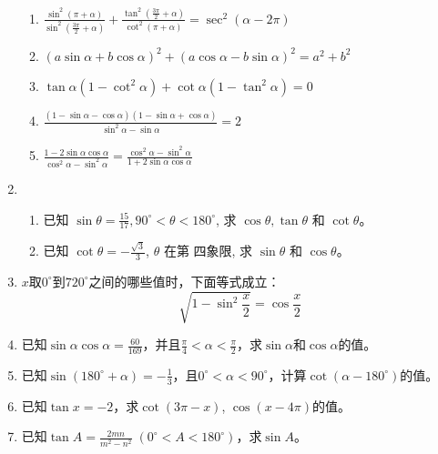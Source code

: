 \begin{enumerate}
\begin{enumerate}
\item $\frac{\sin ^{2}(\pi+\alpha)}{\sin ^{2}\left(\frac{3 \pi}{2}+\alpha\right)}+\frac{\tan^{2}\left(\frac{3 \pi}{2}+\alpha\right)}{\cot^{2}(\pi+\alpha)} =\sec ^{2}(\alpha-2 \pi)$
\item $(a \sin \alpha+b \cos \alpha)^{2}+(a \cos \alpha-b \sin \alpha)^{2}=a^{2}+b^{2}$
\item $\tan \alpha\left(1-\cot^{2} \alpha\right)+\cot \alpha\left(1-\tan^{2} \alpha\right)=0$
\item $\frac{(1-\sin \alpha-\cos \alpha)(1-\sin \alpha+\cos \alpha)}{\sin ^{2} \alpha-\sin \alpha}=2$
\item $\frac{1-2 \sin \alpha \cos \alpha}{\cos ^{2} \alpha-\sin ^{2} \alpha}=\frac{\cos ^{2} \alpha-\sin ^{2} \alpha}{1+2 \sin \alpha \cos \alpha}$
\end{enumerate}

\item \begin{enumerate}
    \item 已知 $\sin \theta=\frac{15}{17}, 90^{\circ}<\theta<180^{\circ}$,
求 $\cos \theta, \tan \theta$ 和 $\cot \theta$。

\item 已知 $\cot \theta=-\frac{\sqrt{3}}{3}$, $\theta$ 在第 四象限, 求 $\sin \theta$ 和 $\cos \theta$。
\end{enumerate} 

\item $x$取$0^{\circ}$到$720^{\circ}$之间的哪些值时，下面等式成立：
\[\sqrt{1-\sin^2\frac{x}{2}}=\cos\frac{x}{2}\]

\item 已知$\sin\alpha\cos\alpha=\frac{60}{169}$，并且$\frac{\pi}{4}<\alpha<\frac{\pi}{2}$，求$\sin\alpha$和$\cos\alpha$的值。

\item 已知$\sin(180^{\circ}+\alpha)=-\frac{1}{3}$，且$0^{\circ}<\alpha<90^{\circ}$，计算$\cot(\alpha-180^{\circ})$的值。
\item 已知$\tan x=-2$，求$\cot(3\pi-x)$, $\cos(x-4\pi)$的值。
\item 已知$\tan A=\frac{2mn}{m^2-n^2}\; (0^{\circ}<A<180^{\circ})$，求$\sin A$。
\end{enumerate}